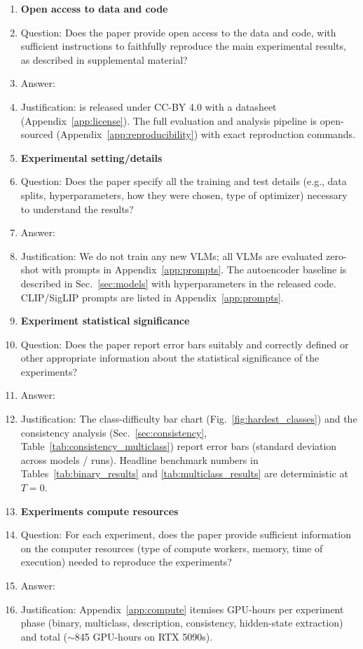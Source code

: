 \begin{enumerate}
\item {\bf Open access to data and code}
    \item[] Question: Does the paper provide open access to the data and code, with sufficient instructions to faithfully reproduce the main experimental results, as described in supplemental material?
    \item[] Answer: \answerYes{}
    \item[] Justification: \bench is released under
          CC-BY 4.0 with a datasheet (Appendix~\ref{app:license}). The
          full evaluation and analysis pipeline is open-sourced
          (Appendix~\ref{app:reproducibility}) with exact reproduction
          commands.

\item {\bf Experimental setting/details}
    \item[] Question: Does the paper specify all the training and test details (e.g., data splits, hyperparameters, how they were chosen, type of optimizer) necessary to understand the results?
    \item[] Answer: \answerYes{}
    \item[] Justification: We do not train any new VLMs;
          all VLMs are evaluated zero-shot with prompts in
          Appendix~\ref{app:prompts}. The autoencoder baseline is
          described in Sec.~\ref{sec:models} with hyperparameters in
          the released code. CLIP/SigLIP prompts are listed in
          Appendix~\ref{app:prompts}.

\item {\bf Experiment statistical significance}
    \item[] Question: Does the paper report error bars suitably and correctly defined or other appropriate information about the statistical significance of the experiments?
    \item[] Answer: \answerYes{}
    \item[] Justification: The class-difficulty bar
          chart (Fig.~\ref{fig:hardest_classes}) and the consistency
          analysis (Sec.~\ref{sec:consistency},
          Table~\ref{tab:consistency_multiclass}) report error bars
          (standard deviation across models / runs). Headline
          benchmark numbers in Tables~\ref{tab:binary_results} and
          \ref{tab:multiclass_results} are deterministic at $T=0$.

\item {\bf Experiments compute resources}
    \item[] Question: For each experiment, does the paper provide sufficient information on the computer resources (type of compute workers, memory, time of execution) needed to reproduce the experiments?
    \item[] Answer: \answerYes{}
    \item[] Justification: Appendix~\ref{app:compute}
          itemises GPU-hours per experiment phase (binary,
          multiclass, description, consistency, hidden-state
          extraction) and total ($\sim$845 GPU-hours on RTX 5090s).


\end{enumerate}
